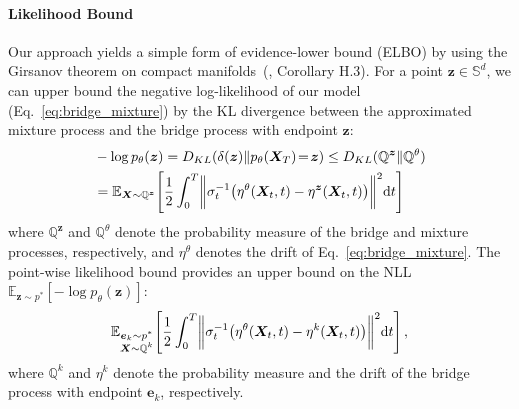 \paragraph{Likelihood Bound}
Our approach yields a simple form of evidence-lower bound (ELBO) by using the Girsanov theorem on compact manifolds~(\citet{de2022riemannian}, Corollary H.3).
For a point $\bm{z}\in\mathbb{S}^d$, we can upper bound the negative log-likelihood of our model (Eq.~\eqref{eq:bridge_mixture}) by the KL divergence between the approximated mixture process and the bridge process with endpoint $\bm{z}$:
\begin{align}
    &-\log p_{\theta}(\bm{z}) 
    = D_{KL}(\delta(\bm{z}) \| p_{\theta}(\bm{X}_T)\!=\!\bm{z})
    \leq D_{KL}(\mathbb{Q}^{\bm{z}} \| \mathbb{Q}^{\theta}) \notag \\
    &= \mathbb{E}_{\bm{X}\sim\mathbb{Q}^{\bm{z}}}\! \left[
        \frac{1}{2}\int^T_0 \!\bigg\| 
        \sigma_t^{-1} \!\left(
        \eta^{\theta}(\bm{X}_t,t) - \eta^{\bm{z}}(\bm{X}_t,t)
    \right) \!\bigg\|^2\mathrm{d}t \right] \notag
\end{align}
where $\mathbb{Q}^{\bm{z}}$ and $\mathbb{Q}^{\theta}$ denote the probability measure of the bridge and mixture processes, respectively, and $\eta^{\theta}$ denotes the drift of Eq.~\eqref{eq:bridge_mixture}.
The point-wise likelihood bound provides an upper bound on the NLL $\mathbb{E}_{\bm{z}\sim  p^{\ast}}[-\log p_{\theta}(\bm{z})]$:
\begin{align}
\hspace{-1mm}
    \mathbb{E}_{\substack{\bm{e}_k\sim  p^{\ast} \\ \bm{X}\sim\mathbb{Q}^{k}}}\! \left[\frac{1}{2}\int^T_0 \!\bigg\| 
        \sigma_t^{-1} \!\left(
        \eta^{\theta}(\bm{X}_t,t) - \eta^{k}(\bm{X}_t,t)
    \right) \!\bigg\|^2\mathrm{d}t \right], \hspace{-1mm}
\label{eq:elbo}
\end{align}
where $\mathbb{Q}^{k}$ and $\eta^k$ denote the probability measure and the drift of the bridge process with endpoint $\bm{e}_k$, respectively.


